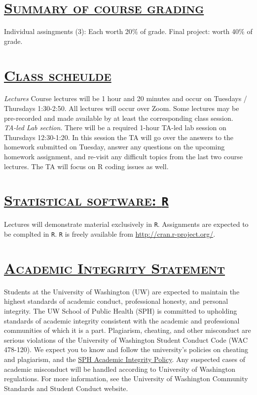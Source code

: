 \documentclass[fancyhdr,10pt]{article}
\begin{document}
\section*{\underline{\textsc{Summary of course grading}}}
Individual assingments (3): Each worth 20$\%$ of grade. Final project: worth 40$\%$ of grade.

\section*{\underline{\textsc{Class scheulde}}}
\textit{Lectures} Course lectures will be 1 hour and 20 minutes and occur on Tuesdays / Thursdays 1:30-2:50. All lectures will occur over Zoom. Some lectures may be pre-recorded and made available by at least the corresponding class session.\\

\textit{TA-led Lab section}. There will be a required 1-hour TA-led lab session on Thursdays 12:30-1:20. In this session the TA will go over the answers to the homework submitted on Tuesday, answer any questions on the upcoming homework assignment, and re-visit any difficult topics from the last two course lectures. The TA will focus on R coding issues as well.

\section*{\underline{\textsc{Statistical software:} \texttt{R}}}
Lectures will demonstrate material exclusively in \verb!R!. Assignments are expected to be complted in \verb!R!. \verb!R! is freely available from \href{http://cran.r-project.org/}{http://cran.r-project.org/}.

\section*{\underline{\textsc{Academic Integrity Statement}}}

Students at the University of Washington (UW) are expected to maintain the highest standards of academic conduct, professional honesty, and personal integrity. The UW School of Public Health (SPH) is committed to upholding standards of academic integrity consistent with the academic and professional communities of which it is a part. Plagiarism, cheating, and other misconduct are serious violations of the University of Washington Student Conduct Code (WAC 478-120). We expect you to know and follow the university's policies on cheating and plagiarism, and the \href{https://sph.washington.edu/students/academic-integrity-policy}{SPH Academic Integrity Policy}. Any suspected cases of academic misconduct will be handled according to University of Washington regulations. For more information, see the University of Washington Community Standards and Student Conduct website.
\end{document}

